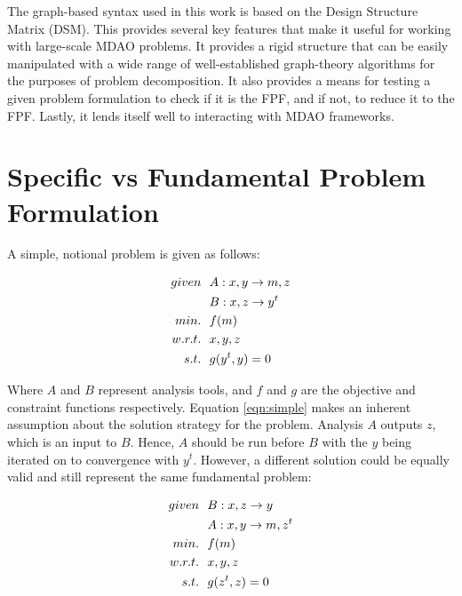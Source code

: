         The graph-based syntax used in this work is based on the Design Structure Matrix (DSM). 
        This provides several key features that make it useful for working with large-scale MDAO problems. 
        It provides a rigid structure that can be easily manipulated with a wide range of well-established graph-theory algorithms 
        for the purposes of problem decomposition. It also provides a means for testing a given 
        problem formulation to check if it is the FPF, and if not, to reduce it to the FPF. Lastly, it lends itself 
        well to interacting with MDAO frameworks. 

    \section{Specific vs Fundamental Problem Formulation }
        A simple, notional problem is given as follows: 

        \begin{align}
            given & \ \ A: {x,y} \rightarrow {m,z} \notag
            \\      & \ \ B: {x,z} \rightarrow {y^t} \notag
            \\min. &\ \ f(m) \notag
            \\w.r.t. & \ \ x,y,z \notag
            \\s.t. & \ \ g(y^t,y) = 0
            \label{eqn:simple}
        \end{align}

        Where $A$ and $B$ represent analysis tools, and $f$ and $g$ are the objective and constraint functions respectively. 
        Equation \ref{eqn:simple} makes an inherent assumption about the solution strategy for the problem. 
        Analysis $A$ outputs $z$, which is an input to $B$. Hence, $A$ should be run before $B$ with 
        the $y$ being iterated on to convergence with $y^t$. However, a different solution could be equally valid and still represent
        the same fundamental problem: 

        \begin{align}
            given & \ \ B: {x,z} \rightarrow {y} \notag
            \\      & \ \ A: {x,y} \rightarrow {m,z^t} \notag
            \\min. &\ \ f(m) \notag
            \\w.r.t. & \ \ x,y,z \notag
            \\s.t. & \ \ g(z^t,z) = 0
            \label{eqn:simple2}
        \end{align}

